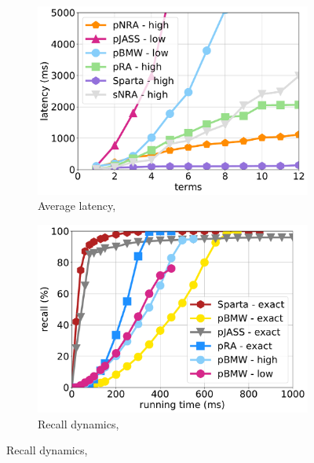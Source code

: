 {{\begin{figure}[tbh]
%    
    \begin{subfigure}{0.32\textwidth}
    \includegraphics[width=\textwidth]{figures/latency_12threads_cluewebX10.pdf}
	\caption{Average latency, \cwten}
	        \label{fig:terms-scaling-10x-avg}
    \end{subfigure}  
	\hfill
      \begin{subfigure}{0.32\textwidth}
         \includegraphics[width=\textwidth]{figures/cumulative_12threads_clueweb.pdf}
        \caption{Recall dynamics, \cw}
        \label{fig:dynamics-clueweb}

\end{subfigure}
\end{figure}}}

